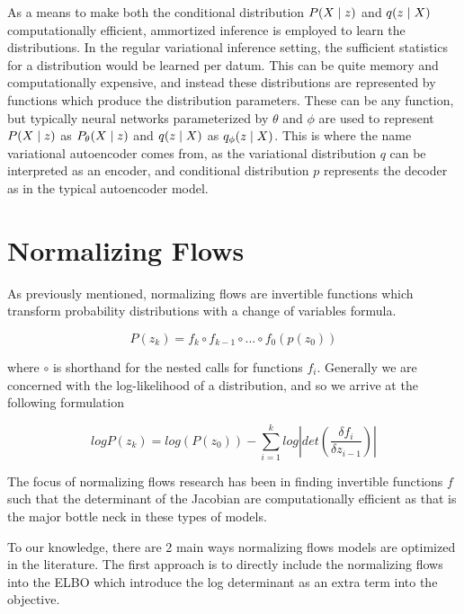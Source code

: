 As a means to make both the conditional distribution $P(X \; | \;{z})$ and $q(z \; | \;{X})$ computationally efficient, ammortized inference  is employed to learn the distributions. In the regular variational inference setting, the sufficient statistics for a distribution would be learned per datum. This can be quite memory and computationally expensive, and instead these distributions are represented by functions which produce the distribution parameters. These can be any function, but typically neural networks parameterized by $\theta$ and $\phi$ are used to represent $P(X \; | \;{z})$ as $P_{\theta}(X \; | \;{z})$ and $q(z \; | \;{X})$ as $q_{\phi}(z \; | \;{X})$. This is where the name variational autoencoder comes from, as the variational distribution $q$ can be interpreted as an encoder, and conditional distribution $p$ represents the decoder as in the typical autoencoder model. 

\section{Normalizing Flows}

As previously mentioned, normalizing flows are invertible functions which transform probability distributions with a change of variables formula.

\begin{equation}
	P(z_{k}) = f_{k} \circ f_{k-1} \circ ... \circ f_{0}(p(z_{0}))
\end{equation} 

where $\circ$ is shorthand for the nested calls for functions $f_{i}$. Generally we are concerned with the log-likelihood of a distribution, and so we arrive at the following formulation



\begin{equation}
	logP(z_{k}) = log(P(z_{0})) - \sum_{i=1}^{k} log |det (\frac{\delta f_{i}}{\delta z_{i-1}}) |
\end{equation}

The focus of normalizing flows research has been in finding invertible functions $f$ such that the determinant of the Jacobian are computationally efficient as that is the major bottle neck in these types of models. 

To our knowledge, there are 2 main ways normalizing flows models are optimized in the literature. The first approach is to directly include the normalizing flows into the \ac{ELBO} which introduce the log determinant as an extra term into the objective.

